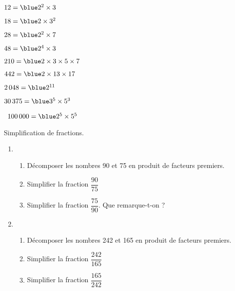 \begin{colonne*exercice}
\begin{corrige}
   \begin{colenumerate}{2}
      \item $12 =\blue 2^2\times3$
      \item $18 =\blue 2\times3^2$
      \item $28 =\blue 2^2\times7$
      \item $48 =\blue 2^4\times3$
      \item $210 =\blue 2\times3\times5\times7$
      \item $442 =\blue 2\times13\times17$
      \item $2\,048 =\blue 2^{11}$
      \item $30\,375 =\blue 3^5\times5^3$
      \item \, $100\,000 =\blue 2^5\times5^5$
   \end{colenumerate}
\end{corrige}

\bigskip


\begin{exercice} %
   Simplification de fractions.
   \begin{enumerate}
      \item
         \begin{enumerate}
            \item Décomposer les nombres 90 et 75 en produit de facteurs premiers.
            \item Simplifier la fraction $\dfrac{90}{75}$ \medskip
            \item Simplifier la fraction $\dfrac{75}{90}$. Que remarque-t-on ? \smallskip
         \end{enumerate}
      \item
         \begin{enumerate}
            \item Décomposer les nombres 242 et 165 en produit de facteurs premiers.
            \item Simplifier la fraction $\dfrac{242}{165}$ \medskip
            \item Simplifier la fraction $\dfrac{165}{242}$
         \end{enumerate}
   \end{enumerate}
\end{exercice}


\end{colonne*exercice}
